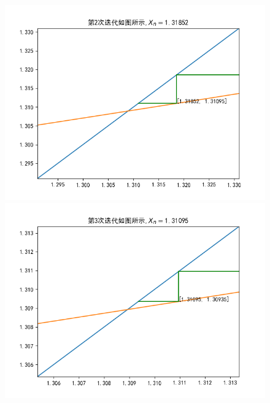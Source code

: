 \documentclass[UTF8]{ctexart}
\begin{document}
\begin{figure}[h]
  \centering
  \begin{minipage}[t]{0.4\linewidth}
  \includegraphics[width=\linewidth]{第2次迭代.png}
  \end{minipage}%
  \begin{minipage}[t]{0.4\linewidth}
  \includegraphics[width=\linewidth]{第3次迭代.png}
  \end{minipage}
\end{figure}
\end{document}
